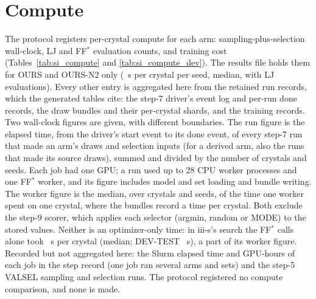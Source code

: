 \documentclass[journal=acsodf,manuscript=article]{achemso}
\begin{document}
\clearpage
\section{Compute}\label{si:compute}
The protocol registers per-crystal compute for each arm: sampling-plus-selection wall-clock,
LJ and FF$^\ast$ evaluation counts, and training cost (Tables~\ref{tab:si_compute} and
\ref{tab:si_compute_dev}). The results file holds them for OURS and OURS-N2 only (\svOursSec~s
per crystal per seed, median, with \svOursLj{} LJ evaluations). Every other entry is aggregated
here from the retained run records, which the generated tables cite: the step-7 driver's event
log and per-run done records, the draw bundles and their per-crystal shards, and the training
records. Two wall-clock figures are given, with different boundaries. The run figure is the
elapsed time, from the driver's start event to its done event, of every step-7 run that made an
arm's draws and selection inputs (for a derived arm, also the runs that made its source draws),
summed and divided by the number of crystals and seeds. Each job had one GPU; a run used up to
28 CPU worker processes and one FF$^\ast$ worker, and its figure includes model and set loading
and bundle writing. The worker figure is the median, over crystals and seeds, of the time one
worker spent on one crystal, where the bundles record a time per crystal. Both exclude the step-9
scorer, which applies each selector (argmin, random or MODE) to the stored values. Neither is an
optimizer-only time: in iii-s's search the FF$^\ast$ calls alone took \svIiisFFSec~s per crystal
(median; DEV-TEST \svIiisFFSecDev~s), a part of its worker figure. Recorded but not aggregated
here: the Slurm elapsed time and GPU-hours of each job in the step record (one job ran several
arms and sets) and the step-5 VALSEL sampling and selection runs. The protocol registered no
compute comparison, and none is made.
\end{document}
